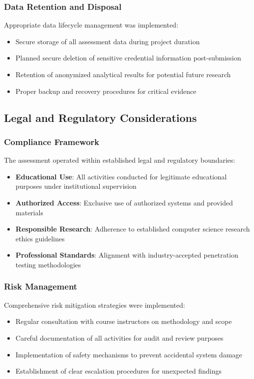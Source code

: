 \subsubsection{Data Retention and Disposal}
Appropriate data lifecycle management was implemented:
\begin{itemize}
    \item Secure storage of all assessment data during project duration
    \item Planned secure deletion of sensitive credential information post-submission
    \item Retention of anonymized analytical results for potential future research
    \item Proper backup and recovery procedures for critical evidence
\end{itemize}

\subsection{Legal and Regulatory Considerations}

\subsubsection{Compliance Framework}
The assessment operated within established legal and regulatory boundaries:

\begin{itemize}
    \item \textbf{Educational Use}: All activities conducted for legitimate educational purposes under institutional supervision
    \item \textbf{Authorized Access}: Exclusive use of authorized systems and provided materials
    \item \textbf{Responsible Research}: Adherence to established computer science research ethics guidelines
    \item \textbf{Professional Standards}: Alignment with industry-accepted penetration testing methodologies
\end{itemize}

\subsubsection{Risk Management}
Comprehensive risk mitigation strategies were implemented:
\begin{itemize}
    \item Regular consultation with course instructors on methodology and scope
    \item Careful documentation of all activities for audit and review purposes
    \item Implementation of safety mechanisms to prevent accidental system damage
    \item Establishment of clear escalation procedures for unexpected findings
\end{itemize}

